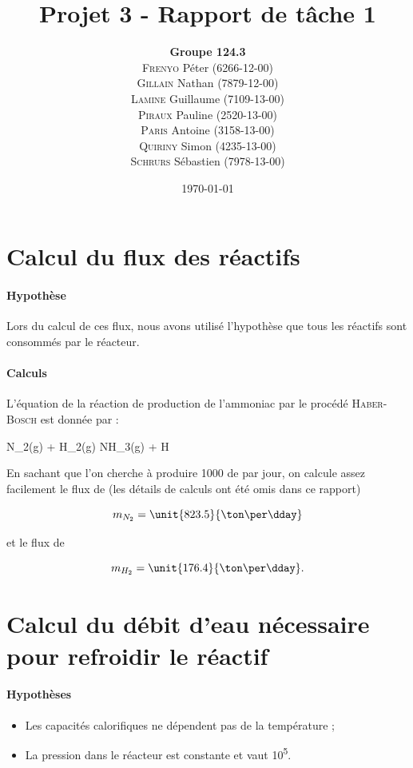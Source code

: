 \documentclass{article}
\title{Projet 3 - Rapport de tâche 1}
\author{\textbf{Groupe 124.3}
\\
\textsc{Frenyo} P\'eter (6266-12-00)\\
\textsc{Gillain} Nathan (7879-12-00)\\
\textsc{Lamine} Guillaume (7109-13-00)\\
\textsc{Piraux} Pauline (2520-13-00)\\
\textsc{Paris} Antoine (3158-13-00)\\
\textsc{Quiriny} Simon (4235-13-00)\\
\textsc{Schrurs} Sébastien (7978-13-00)}
\date{\today}
\begin{document}
\maketitle
\tableofcontents

\section{Calcul du flux des réactifs}

\paragraph{Hypothèse}
Lors du calcul de ces flux, nous avons utilisé l'hypothèse que tous les réactifs sont 
consommés par le réacteur.

\paragraph{Calculs}
L'équation de la réaction de production de l'ammoniac par le procédé \textsc{Haber-Bosch} est donnée par :

	\begin{chemmath}
			N_2(g) + H_2(g) \longrightarrow NH_3(g) + \Delta H
 	\end{chemmath}
	
En sachant que l'on cherche à produire \unit{1000}{\ton} de  par jour, 
on calcule assez facilement le flux de  (les détails de calculs ont été omis
dans ce rapport)

	$$m_{N_2} = \unit{823.5}{\ton\per\dday}$$

et le flux de 

	$$m_{H_2} = \unit{176.4}{\ton\per\dday}.$$

\section{Calcul du débit d'eau nécessaire pour refroidir le réactif}
\paragraph{Hypothèses}
\begin{itemize}
	\item Les capacités calorifiques ne dépendent pas de la température ;
	\item La pression dans le réacteur est constante et vaut \unit{10^5}{\pascal}.
\end{itemize}
\end{document}
